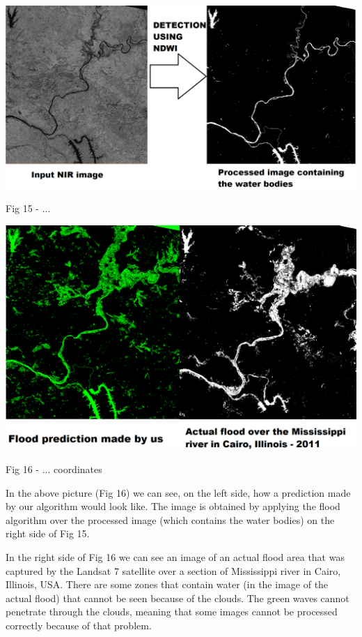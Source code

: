\documentclass[12pt, a4paper]{report}
\begin{document}
\bigskip
\includegraphics[scale=0.3, left]{process1.png}
\begin{center}
Fig 15 - ... 
\end{center}
\par 

\includegraphics[scale=0.4, center]{process3.png}
\begin{center}
Fig 16 - ... coordinates
\end{center}
\par 

In the above picture (Fig 16) we can see, on the left side, how a prediction made by our algorithm would look like. The image is obtained by applying the flood algorithm over the processed image (which contains the water bodies) on the right side of Fig 15. \par 

In the right side of Fig 16 we can see an image of an actual flood area that was captured by the Landsat 7 satellite over a section of Mississippi river in Cairo, Illinois, USA. There are some zones  that contain water (in the image of the actual flood) that cannot be seen because of the clouds. The green waves cannot penetrate through the clouds, meaning that some images cannot be processed correctly because of that problem.
\par 
\end{document}
